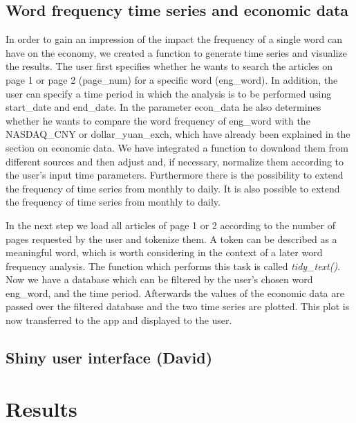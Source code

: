 \documentclass[12pt,a4paper]{article}
\begin{document}
\hypertarget{word-frequency-time-series-and-economic-data}{%
\subsection{Word frequency time series and economic data}\label{word-frequency-time-series-and-economic-data}}

In order to gain an impression of the impact the frequency of a single word can have on the economy, we created a function to generate time series and visualize the results. The user first specifies whether he wants to search the articles on page 1 or page 2 (page\_num) for a specific word (eng\_word). In addition, the user can specify a time period in which the analysis is to be performed using start\_date and end\_date. In the parameter econ\_data he also determines whether he wants to compare the word frequency of eng\_word with the NASDAQ\_CNY or dollar\_yuan\_exch, which have already been explained in the section on economic data. We have integrated a function to download them from different sources and then adjust and, if necessary, normalize them according to the user's input time parameters. Furthermore there is the possibility to extend the frequency of time series from monthly to daily.
It is also possible to extend the frequency of time series from monthly to daily.

In the next step we load all articles of page 1 or 2 according to the number of pages requested by the user and tokenize them. A token can be described as a meaningful word, which is worth considering in the context of a later word frequency analysis. The function which performs this task is called \emph{tidy\_text()}. Now we have a database which can be filtered by the user's chosen word eng\_word, and the time period. Afterwards the values of the economic data are passed over the filtered database and the two time series are plotted. This plot is now transferred to the app and displayed to the user.

\hypertarget{shiny-user-interface-david}{%
\subsection{Shiny user interface (David)}\label{shiny-user-interface-david}}

\hypertarget{results}{%
\section{Results}\label{results}}
\end{document}
